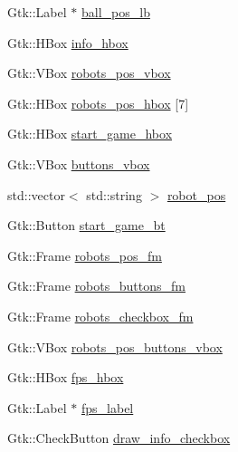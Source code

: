 \begin{DoxyCompactItemize}
\item 
Gtk\+::\+Label $\ast$ \hyperlink{class_v_s_s_s___g_u_i_1_1_v4_l_interface_a878e9b2389e2fd084c51dfe7531dd7a8}{ball\+\_\+pos\+\_\+lb}
\item 
Gtk\+::\+H\+Box \hyperlink{class_v_s_s_s___g_u_i_1_1_v4_l_interface_ae189e841cf752e3b018b2e0eb9f65ea7}{info\+\_\+hbox}
\item 
Gtk\+::\+V\+Box \hyperlink{class_v_s_s_s___g_u_i_1_1_v4_l_interface_a4df8bbaf8380ca272cf9f808cb063928}{robots\+\_\+pos\+\_\+vbox}
\item 
Gtk\+::\+H\+Box \hyperlink{class_v_s_s_s___g_u_i_1_1_v4_l_interface_a02292f4f80004b3ef0a791decfa5cffe}{robots\+\_\+pos\+\_\+hbox} \mbox{[}7\mbox{]}
\item 
Gtk\+::\+H\+Box \hyperlink{class_v_s_s_s___g_u_i_1_1_v4_l_interface_a281c1342843e4fd512a40885f5626480}{start\+\_\+game\+\_\+hbox}
\item 
Gtk\+::\+V\+Box \hyperlink{class_v_s_s_s___g_u_i_1_1_v4_l_interface_ac93993f84d4a790db604f0a98750be00}{buttons\+\_\+vbox}
\item 
std\+::vector$<$ std\+::string $>$ \hyperlink{class_v_s_s_s___g_u_i_1_1_v4_l_interface_ae2fee166aaea0fac25dcab7602462f7d}{robot\+\_\+pos}
\item 
Gtk\+::\+Button \hyperlink{class_v_s_s_s___g_u_i_1_1_v4_l_interface_a3785113cc8707c32049afd5b3f663383}{start\+\_\+game\+\_\+bt}
\item 
Gtk\+::\+Frame \hyperlink{class_v_s_s_s___g_u_i_1_1_v4_l_interface_a26abe1e1e6abc1ac01aaeca2f0df2a8f}{robots\+\_\+pos\+\_\+fm}
\item 
Gtk\+::\+Frame \hyperlink{class_v_s_s_s___g_u_i_1_1_v4_l_interface_a28f81e55680afe51dc29c4179adc762e}{robots\+\_\+buttons\+\_\+fm}
\item 
Gtk\+::\+Frame \hyperlink{class_v_s_s_s___g_u_i_1_1_v4_l_interface_a302b907c10a492726464416488f519d5}{robots\+\_\+checkbox\+\_\+fm}
\item 
Gtk\+::\+V\+Box \hyperlink{class_v_s_s_s___g_u_i_1_1_v4_l_interface_a40f35c5e603def9a0ad69f7d761e0825}{robots\+\_\+pos\+\_\+buttons\+\_\+vbox}
\item 
Gtk\+::\+H\+Box \hyperlink{class_v_s_s_s___g_u_i_1_1_v4_l_interface_a591272897e79c0358ab33cd8170766ae}{fps\+\_\+hbox}
\item 
Gtk\+::\+Label $\ast$ \hyperlink{class_v_s_s_s___g_u_i_1_1_v4_l_interface_a91de027bfa97cc197bb0574873051d1d}{fps\+\_\+label}
\item 
Gtk\+::\+Check\+Button \hyperlink{class_v_s_s_s___g_u_i_1_1_v4_l_interface_a0bd3c429f8b0d92b2b53353dc31e346e}{draw\+\_\+info\+\_\+checkbox}

\end{DoxyCompactItemize}
